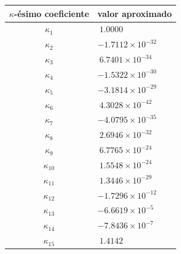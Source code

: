 \begin{center}
	\begin{tabular}{|c|l|}
		\hline
		$\kappa$-ésimo coeficiente & \multicolumn{1}{c|}{valor aproximado}\\\hline\hline
		$\kappa_1$ & $\ 1.0000$ \\
		$\kappa_2$ & $-1.7112\times 10^{-32}$ \\
		$\kappa_3$ & $\ 6.7401\times 10^{-34}$ \\
		$\kappa_4$ & $-1.5322\times 10^{-30}$ \\
		$\kappa_5$ & $-3.1814\times 10^{-29}$ \\
		$\kappa_6$ & $\ 4.3028\times 10^{-42}$ \\
		$\kappa_7$ & $-4.0795\times 10^{-35}$ \\
		$\kappa_8$ & $\ 2.6946\times 10^{-32}$ \\
		$\kappa_9$ & $\ 6.7765\times 10^{-24}$ \\
		$\kappa_{10}$ & $\ 1.5548\times 10^{-24}$ \\
		$\kappa_{11}$ & $\ 1.3446\times 10^{-29}$ \\
		$\kappa_{12}$ & $-1.7296\times 10^{-12}$ \\
		$\kappa_{13}$ & $-6.6619\times 10^{-5}$\\
		$\kappa_{14}$ & $-7.8436\times 10^{-7}$ \\
		$\kappa_{15}$ & $\ 1.4142$\\
		\hline
	\end{tabular}
	\label{tabladecoeficientes2}
\end{center}
\newpage
